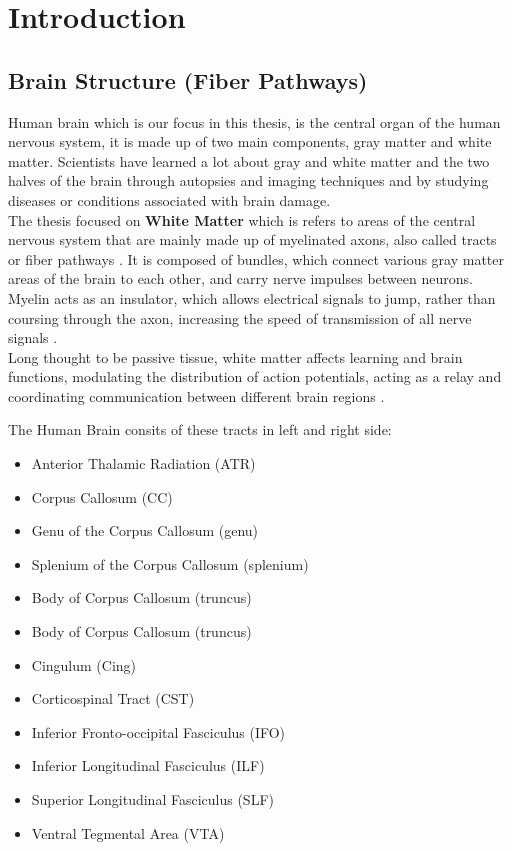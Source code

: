 \documentclass[../structure.tex]{subfiles}
\begin{document}
\chapter{Introduction}
\section{Brain Structure (Fiber Pathways)}
	Human brain which is our focus in this thesis, is the central organ of the human nervous system, it is made up of two main components, gray matter and white matter. Scientists have learned a lot about gray and white matter and the two halves of the brain through autopsies and imaging techniques and by studying diseases or conditions associated with brain damage.
	\\The thesis focused on \textbf{White Matter} which is refers to areas of the central nervous system that are mainly made up of myelinated axons, also called tracts or fiber pathways \cite{Blumenfeld2010}. It is composed of bundles, which connect various gray matter areas of the brain to each other, and carry nerve impulses between neurons. Myelin acts as an insulator, which allows electrical signals to jump, rather than coursing through the axon, increasing the speed of transmission of all nerve signals \cite{Klein2008}.
	\\Long thought to be passive tissue, white matter affects learning and brain functions, modulating the distribution of action potentials, acting as a relay and coordinating communication between different brain regions \cite{Fields2008}.
	
	The Human Brain consits of these tracts in left and right side:
    \begin{itemize}
        \item Anterior Thalamic Radiation (ATR)
        \item Corpus Callosum (CC)
        \item Genu of the Corpus Callosum (genu)
        \item Splenium of the Corpus Callosum (splenium)
        \item Body of Corpus Callosum (truncus)
        \item Body of Corpus Callosum (truncus)
		\item Cingulum (Cing)
		\item Corticospinal Tract (CST)
		\item Inferior Fronto-occipital Fasciculus (IFO)
		\item Inferior Longitudinal Fasciculus (ILF)
		\item Superior Longitudinal Fasciculus (SLF)
		\item Ventral Tegmental Area (VTA)
	\end{itemize}
\end{document}
